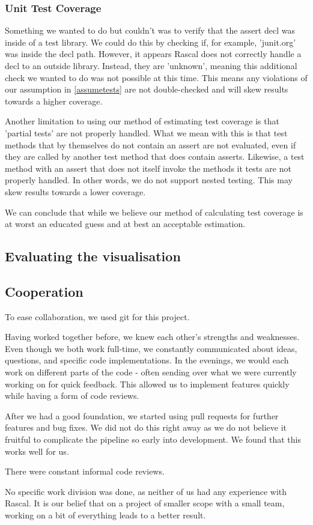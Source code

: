 \documentclass{article}
\begin{document}
\subsubsection{Unit Test Coverage}
Something we wanted to do but couldn't was to verify that the assert decl was inside of a test library. We could do this by checking if, for example, 'junit.org' was inside the decl path. However, it appears Rascal does not correctly handle a decl to an outside library. Instead, they are 'unknown', meaning this additional check we wanted to do was not possible at this time. This means any violations of our assumption in \ref{assumetests} are not double-checked and will skew results towards a higher coverage.

Another limitation to using our method of estimating test coverage is that 'partial tests' are not properly handled. What we mean with this is that test methods that by themselves do not contain an assert are not evaluated, even if they are called by another test method that does contain asserts. Likewise, a test method with an assert that does not itself invoke the methods it tests are not properly handled.
In other words, we do not support nested testing. This may skew results towards a lower coverage.

We can conclude that while we believe our method of calculating test coverage is at worst an educated guess and at best an acceptable estimation.

\subsection{Evaluating the visualisation}

\subsection{Cooperation}
To ease collaboration, we used git for this project.

Having worked together before, we knew each other's strengths and weaknesses. Even though we both work full-time, we constantly communicated about ideas, questions, and specific code implementations. 
In the evenings, we would each work on different parts of the code - often sending over what we were currently working on for quick feedback. This allowed us to implement features quickly while having a form of code reviews.

After we had a good foundation, we started using pull requests for further features and bug fixes. We did not do this right away as we do not believe it fruitful to complicate the pipeline so early into development. We found that this works well for us.

There were constant informal code reviews.

No specific work division was done, as neither of us had any experience with Rascal. It is our belief that on a project of smaller scope with a small team, working on a bit of everything leads to a better result.
\end{document}
